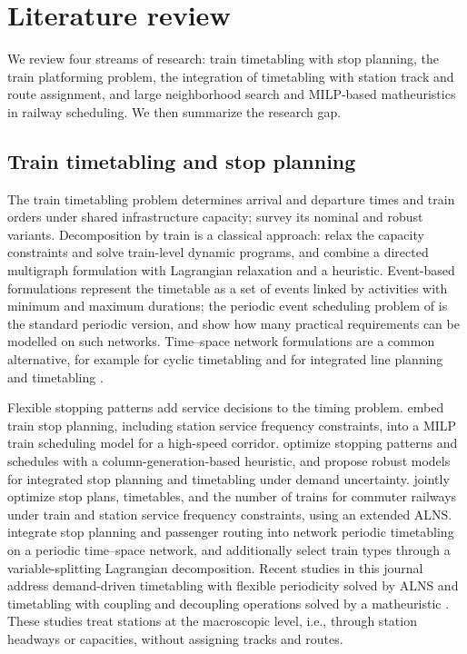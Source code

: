 \section{Literature review}\label{sec:lit}
We review four streams of research: train timetabling with stop planning, the train platforming problem, the integration of timetabling with station track and route assignment, and large neighborhood search and MILP-based matheuristics in railway scheduling. We then summarize the research gap.

\subsection{Train timetabling and stop planning}
The train timetabling problem determines arrival and departure times and train orders under shared infrastructure capacity; \citet{Cacchiani2012} survey its nominal and robust variants. Decomposition by train is a classical approach: \citet{Brannlund1998} relax the capacity constraints and solve train-level dynamic programs, and \citet{Caprara2002} combine a directed multigraph formulation with Lagrangian relaxation and a heuristic. Event-based formulations represent the timetable as a set of events linked by activities with minimum and maximum durations; the periodic event scheduling problem of \citet{Serafini1989} is the standard periodic version, and \citet{Liebchen2007} show how many practical requirements can be modelled on such networks. Time--space network formulations are a common alternative, for example for cyclic timetabling \citep{ZhangY2019b} and for integrated line planning and timetabling \citep{ZhangY2022}.

Flexible stopping patterns add service decisions to the timing problem. \citet{Yang2016} embed train stop planning, including station service frequency constraints, into a MILP train scheduling model for a high-speed corridor. \citet{Yue2016} optimize stopping patterns and schedules with a column-generation-based heuristic, and \citet{Cacchiani2020} propose robust models for integrated stop planning and timetabling under demand uncertainty. \citet{Dong2020} jointly optimize stop plans, timetables, and the number of trains for commuter railways under train and station service frequency constraints, using an extended ALNS. \citet{Yao2023} integrate stop planning and passenger routing into network periodic timetabling on a periodic time--space network, and \citet{Tian2024} additionally select train types through a variable-splitting Lagrangian decomposition. Recent studies in this journal address demand-driven timetabling with flexible periodicity solved by ALNS \citep{Yin2024} and timetabling with coupling and decoupling operations solved by a matheuristic \citep{Liu2024}. These studies treat stations at the macroscopic level, i.e., through station headways or capacities, without assigning tracks and routes.

